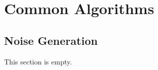 \section{Common Algorithms}

\subsection{Noise Generation}
\label{section:noise-generation}
This section is empty.